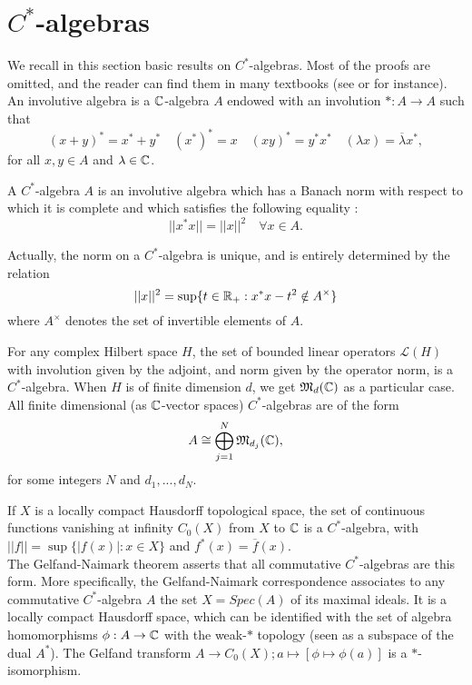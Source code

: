 \section{$C^*$-algebras} %

We recall in this section basic results on $C^*$-algebras. Most of the proofs are omitted, and the reader can find them in many textbooks (see \cite{Murphy} or \cite{WeggeOlsen} for instance).\\

An involutive algebra is a $\mathbb C$-algebra $A$ endowed with an involution $* : A\rightarrow A$ such that 
\[ (x+y)^*=x^*+y^* \quad (x^*)^* =x \quad (xy)^* = y^* x^* \quad (\lambda x ) = \overline{\lambda}x^*,\]
for all $x,y\in A$ and $\lambda\in\mathbb C$.
 
\begin{definition}
A $C^*$-algebra $A$ is an involutive algebra which has a Banach norm with respect to which it is complete and which satisfies the following equality :
\[ || x^* x || = || x ||^2\quad \forall x\in A. \]
\end{definition}

Actually, the norm on a $C^*$-algebra is unique, and is entirely determined by the relation
\[ ||x||^2 = \sup \{t\in \mathbb R_+ : x^*x-t^2 \notin A^{\times}\} \]
where $A^\times$ denotes the set of invertible elements of $A$.

\begin{Expl}
For any complex Hilbert space $H$, the set of bounded linear operators $\mathcal L(H)$ with involution given by the adjoint, and norm given by the operator norm, is a $C^*$-algebra. When $H$ is of finite dimension $d$, we get $\mathfrak M_d(\mathbb C)$ as a particular case.\\

All finite dimensional (as $\mathbb C$-vector spaces) $C^*$-algebras are of the form
\[A \cong \bigoplus_{j=1}^N \mathfrak M_{d_j}(\mathbb C),\]
for some integers $N$ and $d_1,...,d_N$.
\end{Expl}

\begin{Expl}
If $X$ is a locally compact Hausdorff topological space, the set of continuous functions vanishing at infinity $C_0(X)$ from $X$ to $\mathbb C$ is a $C^*$-algebra, with $||f||=\sup\{|f(x)| : x\in X\}$ and $f^*(x)=\overline f(x)$.\\

The Gelfand-Naimark theorem asserts that all commutative $C^*$-algebras are this form. More specifically, the Gelfand-Naimark correspondence associates to any commutative $C^*$-algebra $A$ the set $X=Spec(A)$ of its maximal ideals. It is a locally compact Hausdorff space, which can be identified with the set of algebra homomorphisms $\phi : A\rightarrow \mathbb C$ with the weak-$*$ topology (seen as a subspace of the dual $A^*$). The Gelfand transform $A\rightarrow C_0(X) ; a \mapsto [\phi\mapsto \phi(a)]$ is a $*$-isomorphism.
\end{Expl}

